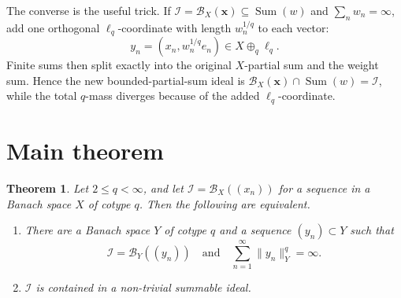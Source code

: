 \documentclass[11pt]{amsart}
\newtheorem{theorem}{Theorem}
\newcommand{\I}{\mathcal I}
\newcommand{\B}{\mathcal B}
\newcommand{\Sum}{\operatorname{Sum}}
\begin{document}
The converse is the useful trick.  If
\(\I=\B_X(\mathbf x)\subseteq \Sum(w)\) and \(\sum_n w_n=\infty\), add one
orthogonal \(\ell_q\)-coordinate with length \(w_n^{1/q}\) to each vector:
\[
  y_n=(x_n,w_n^{1/q}e_n)\in X\oplus_q\ell_q.
\]
Finite sums then split exactly into the original \(X\)-partial sum and the
weight sum.  Hence the new bounded-partial-sum ideal is
\(\B_X(\mathbf x)\cap\Sum(w)=\I\), while the total \(q\)-mass diverges because of
the added \(\ell_q\)-coordinate.

\section*{Main theorem}

\begin{theorem}
\label{thm:equivalence}
Let \(2\le q<\infty\), and let
\(\I=\B_X((x_n))\) for a sequence in a Banach space \(X\) of cotype \(q\).
Then the following are equivalent.
\begin{enumerate}
\item There are a Banach space \(Y\) of cotype \(q\) and a sequence
  \((y_n)\subset Y\) such that
  \[
    \I=\B_Y((y_n))
    \quad\text{and}\quad
    \sum_{n=1}^\infty \|y_n\|_Y^q=\infty .
  \]
\item \(\I\) is contained in a non-trivial summable ideal.
\end{enumerate}
\end{theorem}
\end{document}
